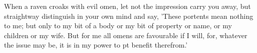 When a raven croaks with evil omen,  let not the impression carry you away, but
straightway distinguish in your own mind  and say, 'These portents mean nothing
to me;  but only  to my bit  of a  body or my  bit of property  or name,  or my
children  or my  wife. But  for me  all omens  are favourable  if I  will, for,
whatever the issue may be, it is in my power to pt benefit therefrom.'
